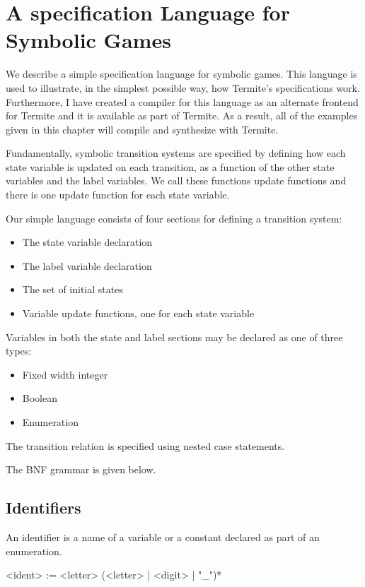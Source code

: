 \section{A specification Language for Symbolic Games}

We describe a simple specification language for symbolic games. This language is used to illustrate, in the simplest possible way, how Termite's specifications work. Furthermore, I have created a compiler for this language as an alternate frontend for Termite and it is available as part of Termite. As a result, all of the examples given in this chapter will compile and synthesize with Termite.

Fundamentally, symbolic transition systems are specified by defining how each state variable is updated on each transition, as a function of the other state variables and the label variables. We call these functions update functions and there is one update function for each state variable. 

Our simple language consists of four sections for defining a transition system:
\begin{itemize}
    \item The state variable declaration
    \item The label variable declaration
    \item The set of initial states
    \item Variable update functions, one for each state variable
\end{itemize}

Variables in both the state and label sections may be declared as one of three types:
\begin{itemize}
    \item Fixed width integer
    \item Boolean
    \item Enumeration
\end{itemize}

The transition relation is specified using nested case statements.

The BNF grammar is given below.

\subsection{Identifiers}

An identifier is a name of a variable or a constant declared as part of an enumeration.

\begin{bnflisting}
    <ident>    := <letter> (<letter> | <digit> | "_")*
\end{bnflisting}

